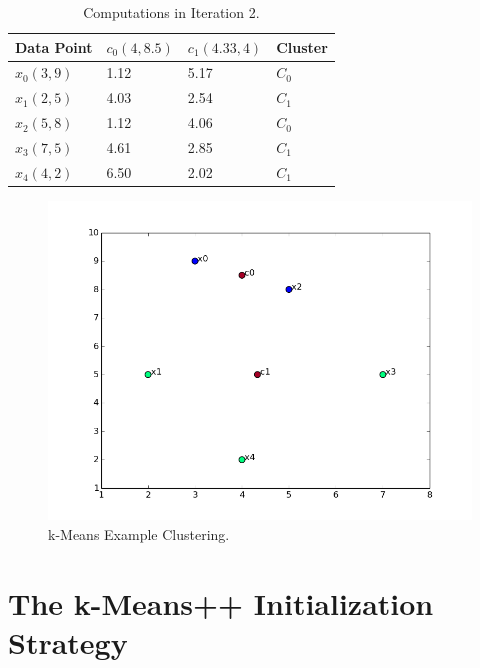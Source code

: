 \begin{table}[htsb]
  \caption[Computations in Iteration 2]{Computations in Iteration 2.}\label{tab:kmeans_iter_2}
  \centering
  \begin{tabular}{l l l l}
    \toprule
      Data Point & $c_0(4,8.5)$ & $c_1(4.33,4)$ & Cluster \\
    \midrule
        $x_0(3,9)$ & 1.12 & 5.17 & $C_0$ \\
        $x_1(2,5)$ & 4.03 & 2.54 & $C_1$ \\
        $x_2(5,8)$ & 1.12 & 4.06 & $C_0$ \\
        $x_3(7,5)$ & 4.61 & 2.85 & $C_1$ \\
        $x_4(4,2)$ & 6.50 & 2.02 & $C_1$ \\
    \bottomrule
  \end{tabular}
\end{table}


\begin{figure}[htsb]
  \centering
  \includegraphics[scale=0.5, trim="0cm 1cm 0cm 0cm"]{figures/kmeans_example}
  \caption[k-Means Example Clustering]{k-Means Example Clustering.}\label{fig:kmeans_example}
\end{figure}




\section{The k-Means++ Initialization Strategy}

